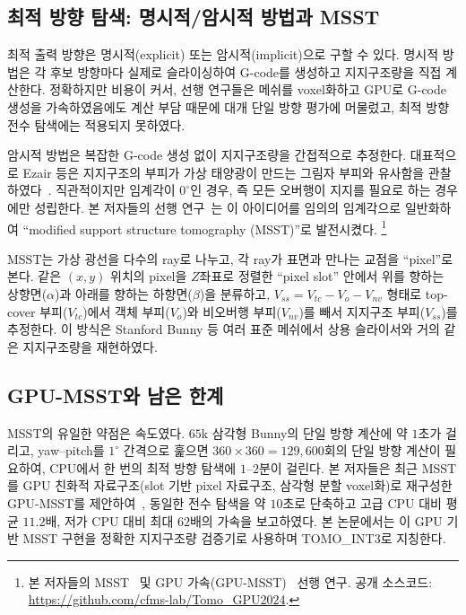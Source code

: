 \documentclass[11pt,a4paper]{article}
\begin{document}
\subsection{최적 방향 탐색: 명시적/암시적 방법과 MSST}

최적 출력 방향은 명시적(explicit) 또는 암시적(implicit)으로 구할 수 있다.
명시적 방법은 각 후보 방향마다 실제로 슬라이싱하여 G-code를 생성하고 지지구조량을 직접 계산한다.
정확하지만 비용이 커서, 선행 연구들은 메쉬를 voxel화하고 GPU로 G-code 생성을 가속하였음에도
계산 부담 때문에 대개 단일 방향 평가에 머물렀고, 최적 방향 전수 탐색에는 적용되지 못하였다.

암시적 방법은 복잡한 G-code 생성 없이 지지구조량을 간접적으로 추정한다.
대표적으로 Ezair 등은 지지구조의 부피가 가상 태양광이 만드는 그림자 부피와 유사함을 관찰하였다~\cite{ezair}.
직관적이지만 임계각이 $0^\circ$인 경우, 즉 모든 오버행이 지지를 필요로 하는 경우에만 성립한다.
본 저자들의 선행 연구~\cite{msst}는 이 아이디어를 임의의 임계각으로 일반화하여
``modified support structure tomography (MSST)''로 발전시켰다.%
\footnote{본 저자들의 MSST~\cite{msst} 및 GPU 가속(GPU-MSST)~\cite{gpumsst} 선행 연구. 공개 소스코드:
\url{https://github.com/cfms-lab/Tomo_GPU2024}.}

MSST는 가상 광선을 다수의 ray로 나누고, 각 ray가 표면과 만나는 교점을 ``pixel''로 본다.
같은 $(x,y)$ 위치의 pixel을 $Z$좌표로 정렬한 ``pixel slot'' 안에서
위를 향하는 상향면($\alpha$)과 아래를 향하는 하향면($\beta$)을 분류하고,
$V_{ss}=V_{tc}-V_o-V_{nv}$ 형태로 top-cover 부피($V_{tc}$)에서 객체 부피($V_o$)와
비오버행 부피($V_{nv}$)를 빼서 지지구조 부피($V_{ss}$)를 추정한다.
이 방식은 Stanford Bunny 등 여러 표준 메쉬에서 상용 슬라이서와 거의 같은 지지구조량을 재현하였다.

\subsection{GPU-MSST와 남은 한계}

MSST의 유일한 약점은 속도였다.
$65$k 삼각형 Bunny의 단일 방향 계산에 약 $1$초가 걸리고,
yaw--pitch를 $1^\circ$ 간격으로 훑으면 $360\times360=129{,}600$회의 단일 방향 계산이 필요하여,
CPU에서 한 번의 최적 방향 탐색에 $1$--$2$분이 걸린다.
본 저자들은 최근 MSST를 GPU 친화적 자료구조(slot 기반 pixel 자료구조, 삼각형 분할 voxel화)로
재구성한 GPU-MSST를 제안하여~\cite{gpumsst}, 동일한 전수 탐색을 약 $10$초로 단축하고
고급 CPU 대비 평균 $11.2$배, 저가 CPU 대비 최대 $62$배의 가속을 보고하였다.
본 논문에서는 이 GPU 기반 MSST 구현을 정확한 지지구조량 검증기로 사용하며 TOMO\_INT3로 지칭한다.
\end{document}
